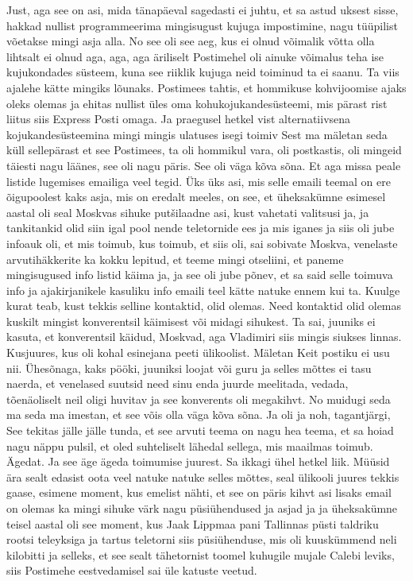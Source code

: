 Just, aga see on asi, mida tänapäeval sagedasti ei juhtu, et sa astud uksest sisse, hakkad nullist programmeerima mingisugust kujuga impostimine, nagu tüüpilist võetakse mingi asja alla.
No see oli see aeg, kus ei olnud võimalik võtta olla lihtsalt ei olnud aga, aga, aga äriliselt Postimehel oli ainuke võimalus teha ise kujukondades süsteem, kuna see riiklik kujuga neid toiminud ta ei saanu. Ta viis ajalehe kätte mingiks lõunaks. Postimees tahtis, et hommikuse kohvijoomise ajaks oleks olemas ja ehitas nullist üles oma kohukojukandesüsteemi, mis pärast rist liitus siis Express Posti omaga. Ja praegusel hetkel vist alternatiivsena kojukandesüsteemina mingi mingis ulatuses isegi toimiv
Sest ma mäletan seda küll sellepärast et see Postimees, ta oli hommikul vara, oli postkastis, oli mingeid täiesti nagu läänes, see oli nagu päris. See oli väga kõva sõna. Et aga missa peale listide lugemises emailiga veel tegid.
Üks üks asi, mis selle emaili teemal on ere õigupoolest kaks asja, mis on eredalt meeles, on see, et üheksakümne esimesel aastal oli seal Moskvas sihuke putšilaadne asi, kust vahetati valitsusi ja, ja tankitankid olid siin igal pool nende teletornide ees ja mis iganes ja siis oli jube infoauk oli, et mis toimub, kus toimub, et siis oli, sai sobivate Moskva, venelaste arvutihäkkerite ka kokku lepitud, et teeme mingi otseliini, et paneme mingisugused info listid käima ja, ja see oli jube põnev, et sa said selle toimuva info ja ajakirjanikele kasuliku info emaili teel kätte natuke ennem kui ta. Kuulge kurat teab, kust tekkis selline kontaktid, olid olemas. Need kontaktid olid olemas kuskilt mingist konverentsil käimisest või midagi sihukest. Ta sai, juuniks ei kasuta, et konverentsil käidud, Moskvad, aga Vladimiri siis mingis siukses linnas. Kusjuures, kus oli kohal esinejana peeti ülikoolist. Mäletan Keit postiku ei usu nii. Ühesõnaga, kaks pööki, juuniksi loojat või guru ja selles mõttes ei tasu naerda, et venelased suutsid need sinu enda juurde meelitada, vedada, tõenäoliselt neil oligi huvitav ja see konverents oli megakihvt.
No muidugi seda ma seda ma imestan, et see võis olla väga kõva sõna.
Ja oli ja noh, tagantjärgi,
See tekitas jälle jälle tunda, et see arvuti teema on nagu hea teema, et sa hoiad nagu näppu pulsil, et oled suhteliselt lähedal sellega, mis maailmas toimub. Ägedat.
Ja see äge ägeda toimumise juurest. Sa ikkagi ühel hetkel liik.
Müüsid ära sealt edasist oota veel natuke natuke selles mõttes, seal ülikooli juures tekkis gaase, esimene moment, kus emelist nähti, et see on päris kihvt asi lisaks email on olemas ka mingi sihuke värk nagu püsiühendused ja asjad ja ja üheksakümne teisel aastal oli see moment, kus Jaak Lippmaa pani Tallinnas püsti taldriku rootsi teleyksiga ja tartus teletorni siis püsiühenduse, mis oli kuuskümmend neli kilobitti ja selleks, et see sealt tähetornist toomel kuhugile mujale Calebi leviks, siis Postimehe eestvedamisel sai üle katuste veetud.
